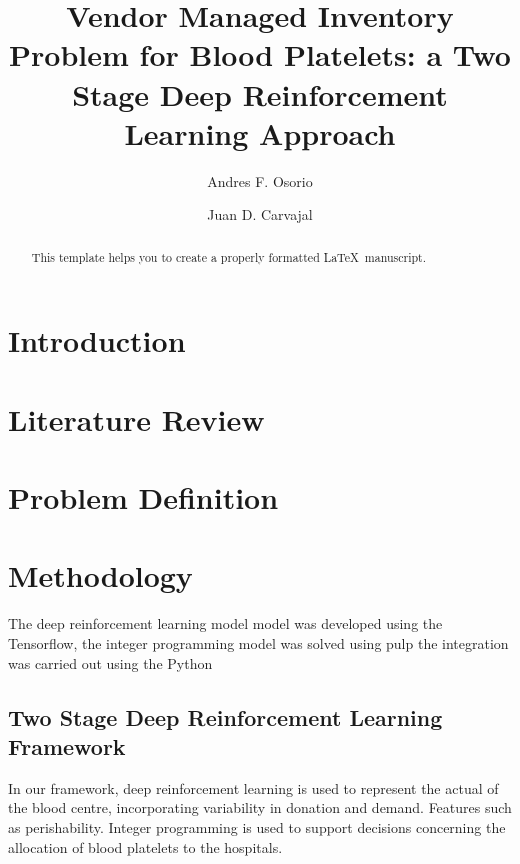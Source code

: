 \documentclass{elsarticle}
\begin{document}
\begin{frontmatter}

\title{Vendor Managed Inventory Problem for Blood Platelets: a Two Stage Deep Reinforcement Learning Approach}

\author[1]{Andres F. Osorio}
\author[2]{Juan D. Carvajal}


\address[1]{afosorio@icesi.edu.co}
\address[2]{juan030698@hotmail.com}


\begin{abstract}
This template helps you to create a properly formatted \LaTeX\ manuscript.
\end{abstract}


\end{frontmatter}


\section{Introduction}

\section{Literature Review}

\section{Problem Definition}

\section{Methodology}

		The deep reinforcement learning model model was developed using the Tensorflow, the integer programming model was solved using pulp the integration was carried out using the Python
		
		\cite{Feynman1963118}
		\cite{Dirac1953888}
		
	\subsection{Two Stage Deep Reinforcement Learning Framework}
	
	In our framework, deep reinforcement learning is used to represent the actual of the blood centre, incorporating variability in donation and demand. Features such as perishability. Integer programming is used to support decisions concerning the allocation of blood platelets to the hospitals.
\end{document}
